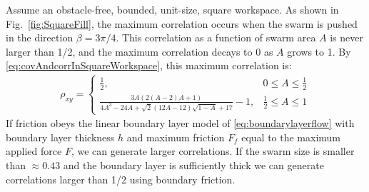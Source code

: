 Assume an obstacle-free, bounded, unit-size, square workspace. 
 As shown in Fig.~\ref{fig:SquareFill}, the maximum correlation occurs when the swarm is pushed in the direction $\beta = 3\pi/4$. 
 This correlation as a function of swarm area $A$ is never larger than 1/2, and the maximum correlation decays to 0 as $A$ grows to 1. By  \eqref{eq:covAndcorrInSquareWorkspace}, this maximum correlation is:
\begin{align} \label{eq:GravityCorrelation}
\rho_{xy} =  \begin{cases}  \frac{1}{2}  , &  0\le A\le \frac{1}{2}  \\
 \frac{3 A (2 (A-2) A+1)}{4 A^3-24 A+\sqrt{2} (12 A-12) \sqrt{1-A}+17}-1
 , & \frac{1}{2} \le A\le 1
\end{cases}
\end{align}
 If friction obeys the linear boundary layer model of \eqref{eq:boundarylayerflow} with boundary layer thickness $h$ and maximum friction $F_f$ equal to the maximum applied force $F$, we can generate  larger correlations.
 If the swarm size is smaller than $\approx 0.43$ and the boundary layer is sufficiently thick we can generate correlations larger than 1/2  using boundary friction.

